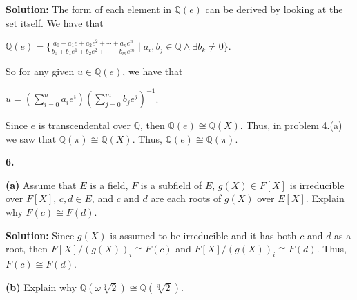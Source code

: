 \documentclass[12pt, a4paper]{article}
\begin{document}
\vspace{4mm}

\noindent\textbf{Solution:} The form of each element in $\mathbb{Q}(e)$ can be derived by looking at the set itself. We have that 

\vspace{2mm}

\centerline{$ \mathbb{Q}(e)=\{\frac{a_0+a_1e+a_2e^2+\cdots+a_ne^n}{b_0+b_1e^1+b_2e^2+\cdots+b_me^m}\mid a_i,b_j\in\mathbb{Q}\wedge\exists b_k\neq 0\} $.}

\vspace{2mm}

\noindent So for any given $u\in\mathbb{Q}(e)$, we have that 

\vspace{2mm}

\centerline{$ u=(\sum\limits_{i=0}^{n} a_ie^i)(\sum\limits_{j=0}^{m} b_je^j)^{-1} $.}

\vspace{2mm}

\noindent Since $e$ is transcendental over $\mathbb{Q}$, then $\mathbb{Q}(e)\cong\mathbb{Q}(X)$. Thus, in problem 4.(a) we saw that $\mathbb{Q}(\pi)\cong\mathbb{Q}(X)$. Thus, $\mathbb{Q}(e)\cong\mathbb{Q}(\pi)$. 

\vspace{4mm}

\noindent\textbf{6.}

\vspace{4mm}\par

\textbf{(a)} Assume that $E$ is a field, $F$ is a subfield of $E$, $g(X)\in F[X]$ is irreducible over $F[X]$, $c,d\in E$, and $c$ and $d$ are each roots of $g(X)$ over $E[X]$. Explain why $F(c)\cong F(d)$.

\vspace{4mm}\par

\textbf{Solution:} Since $g(X)$ is assumed to be irreducible and it has both $c$ and $d$ as a root, then $F[X]/(g(X))_i\cong F(c)$ and $F[X]/(g(X))_i\cong F(d)$. Thus, $F(c)\cong F(d)$.

\vspace{4mm}\par

\textbf{(b)} Explain why $\mathbb{Q}(\omega\sqrt[3]{2})\cong\mathbb{Q}(\sqrt[3]{2})$.

\vspace{4mm}\par
\end{document}
